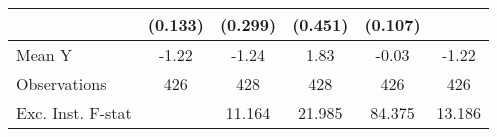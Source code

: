 {\begin{tabular}{l*{5}{c}}
            &     (0.133)         &     (0.299)         &     (0.451)         &     (0.107)         &                     \\
\midrule
Mean Y      &       -1.22         &       -1.24         &        1.83         &       -0.03         &       -1.22         \\
Observations&         426         &         428         &         428         &         426         &         426         \\
Exc. Inst. F-stat&                     &      11.164         &      21.985         &      84.375         &      13.186         \\
\bottomrule
\end{tabular}
}
